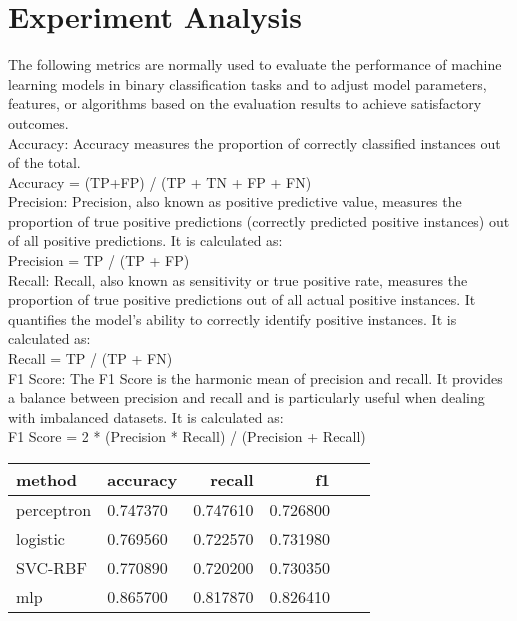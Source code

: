 \documentclass[10pt,twocolumn,letterpaper]{article}
\begin{document}
\section{Experiment Analysis}
The following metrics are normally used to evaluate the performance of machine learning models in binary classification tasks and to adjust model parameters, features, or algorithms based on the evaluation results to achieve satisfactory outcomes.\cite{8093539}\\
\indent Accuracy: Accuracy measures the proportion of correctly classified instances out of the total.\\
\indent \indent \indent Accuracy = (TP+FP) / (TP + TN + FP + FN)\\
\indent Precision: Precision, also known as positive predictive value, measures the proportion of true positive predictions (correctly predicted positive instances) out of all positive predictions. It is calculated as:\\
\indent \indent \indent Precision = TP / (TP + FP)\\
\indent Recall: Recall, also known as sensitivity or true positive rate, measures the proportion of true positive predictions out of all actual positive instances. It quantifies the model's ability to correctly identify positive instances. It is calculated as:\\
\indent \indent \indent Recall = TP / (TP + FN)\\
\indent F1 Score: The F1 Score is the harmonic mean of precision and recall. It provides a balance between precision and recall and is particularly useful when dealing with imbalanced datasets. It is calculated as:\\
F1 Score = 2 * (Precision * Recall) / (Precision + Recall)\\

\begin{tabular}{llrrrr}
  \toprule
   method & accuracy & recall & f1 \\
  \midrule
   perceptron & 0.747370  & 0.747610 & 0.726800 \\
   logistic & 0.769560  & 0.722570 & 0.731980 \\
   SVC-RBF & 0.770890  & 0.720200 & 0.730350 \\
   mlp & 0.865700 & 0.817870 & 0.826410 \\
  \bottomrule
  \end{tabular}
  
  
\end{document}
